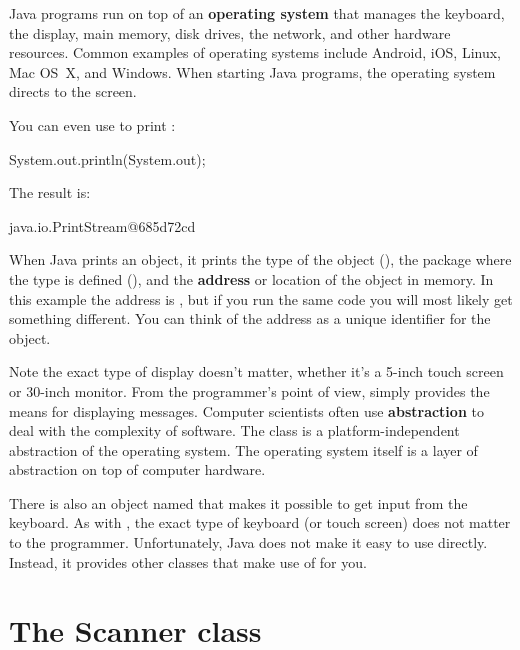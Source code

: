 
Java programs run on top of an {\bf operating system} that manages the keyboard, the display, main memory, disk drives, the network, and other hardware resources.
Common examples of operating systems include Android, iOS, Linux, Mac OS~X, and Windows.
When starting Java programs, the operating system directs  to the screen.

You can even use  to print :

\begin{code}
System.out.println(System.out);
\end{code}

The result is:

\begin{stdout}
java.io.PrintStream@685d72cd
\end{stdout}


When Java prints an object, it prints the type of the object (), the package where the type is defined (), and the {\bf address} or location of the object in memory.
In this example the address is , but if you run the same code you will most likely get something different.
You can think of the address as a unique identifier for the object.


Note the exact type of display doesn't matter, whether it's a 5-inch touch screen or 30-inch monitor.
From the programmer's point of view,  simply provides the means for displaying messages.
Computer scientists often use {\bf abstraction} to deal with the complexity of software.
The  class is a platform-independent abstraction of the operating system.
The operating system itself is a layer of abstraction on top of computer hardware.

There is also an object named  that makes it possible to get input from the keyboard.
As with , the exact type of keyboard (or touch screen) does not matter to the programmer.
Unfortunately, Java does not make it easy to use  directly.
Instead, it provides other classes that make use of  for you.


\section{The Scanner class}

